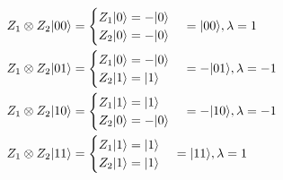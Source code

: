 \documentclass[12pt, a4paper]{report}
\begin{document}
\begin{equation*}
    \begin{split}
        Z_{1}\otimes Z_{2}| 00 \rangle &= \begin{cases}
            Z_{1}| 0 \rangle = -| 0 \rangle\\
            Z_{2}| 0 \rangle = -| 0 \rangle
        \end{cases} = | 00 \rangle, \lambda = 1 \\
        Z_{1}\otimes Z_{2}| 01 \rangle &= \begin{cases}
            Z_{1}| 0 \rangle = -| 0 \rangle\\
            Z_{2}| 1 \rangle = | 1 \rangle
        \end{cases} = -| 01 \rangle, \lambda = -1 \\
        Z_{1}\otimes Z_{2}| 10 \rangle &= \begin{cases}
            Z_{1}| 1 \rangle = | 1 \rangle\\
            Z_{2}| 0 \rangle = -| 0 \rangle
        \end{cases} = -| 10 \rangle, \lambda = -1 \\
        Z_{1}\otimes Z_{2}| 11 \rangle &= \begin{cases}
            Z_{1}| 1 \rangle = | 1 \rangle\\
            Z_{2}| 1 \rangle = | 1 \rangle
        \end{cases} = | 11 \rangle, \lambda = 1 \\
    \end{split}
\end{equation*}
\end{document}
